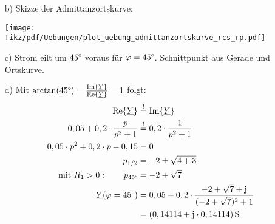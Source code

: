 {\begin{minipage}{0.4\textwidth}
\begin{itemize}
\item[b)] Skizze der Admittanzortskurve:
\item[] \texttt{[image: Tikz/pdf/Uebungen/plot\_uebung\_admittanzortskurve\_rcs\_rp.pdf]}
\item[c)] Strom eilt um $45\degree$ voraus für $\varphi=45\degree$.
    Schnittpunkt aus Gerade und Ortskurve.
\end{itemize}
\end{minipage}%
\begin{minipage}{0.6\textwidth}
\begin{itemize}
    \item[d)] Mit $\arctan(45\degree)=\frac{\operatorname{Im}\{\underline{Y}\}}{\operatorname{Re}\{\underline{Y}\}} = 1$ folgt:
    \begin{align*}
        \operatorname{Re}\{\underline{Y}\} &\overset{!}{=} \operatorname{Im}\{\underline{Y}\} \\
        0,05 + 0,2 \cdot \frac{p}{p^2+1} &\overset{!}{=} 0,2 \cdot \frac{1}{p^2+1}\\ 
        0,05 \cdot p^2 + 0,2 \cdot p - 0,15 &= 0 \\
        p_{1/2} &= -2 \pm \sqrt{4 + 3} \\
        \text{mit }R_1>0: \qquad p_{45\degree} &= -2 + \sqrt{7} \\
        \underline{Y}(\varphi=45\degree) &= 0,05 + 0,2 \cdot \frac{-2 + \sqrt{7} + \mathrm{j}}{(-2 + \sqrt{7})^2 + 1} \\
        &= (0,14114 + \mathrm{j} \cdot 0,14114)\,\mathrm{S}
    \end{align*}
\end{itemize}
\end{minipage}\hfill
}


